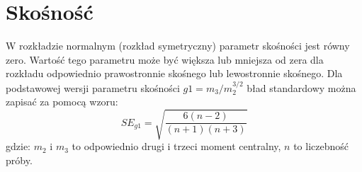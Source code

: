 \documentclass[polish,]{book}
\newenvironment{Shaded}{\begin{snugshade}}{\end{snugshade}}
\newcommand{\BuiltInTok}[1]{#1}
\newcommand{\CharTok}[1]{\textcolor[rgb]{0.31,0.60,0.02}{#1}}
\newcommand{\ControlFlowTok}[1]{\textcolor[rgb]{0.13,0.29,0.53}{\textbf{#1}}}
\newcommand{\DecValTok}[1]{\textcolor[rgb]{0.00,0.00,0.81}{#1}}
\newcommand{\FloatTok}[1]{\textcolor[rgb]{0.00,0.00,0.81}{#1}}
\newcommand{\ImportTok}[1]{#1}
\newcommand{\KeywordTok}[1]{\textcolor[rgb]{0.13,0.29,0.53}{\textbf{#1}}}
\newcommand{\NormalTok}[1]{#1}
\newcommand{\OperatorTok}[1]{\textcolor[rgb]{0.81,0.36,0.00}{\textbf{#1}}}
\newcommand{\StringTok}[1]{\textcolor[rgb]{0.31,0.60,0.02}{#1}}
\begin{document}
\hypertarget{R76}{%
\section{Skośność}\label{R76}}

W rozkładzie normalnym (rozkład symetryczny) parametr skośności jest równy zero. Wartość tego parametru może być większa lub mniejsza od zera dla rozkładu odpowiednio prawostronnie skośnego lub lewostronnie skośnego. Dla podstawowej wersji parametru skośności \(g1=m_3/m_2^{3/2}\) bład standardowy można zapisać za pomocą wzoru:
\begin{equation}
SE_{g1}=\sqrt{\frac{6(n-2)}{(n+1)(n+3)}}
\label{eq:sk01}
\end{equation}
gdzie: \(m_2\) i \(m_3\) to odpowiednio drugi i trzeci moment centralny, \(n\) to liczebność próby.

\begin{Shaded}
\end{Shaded}
\end{document}
